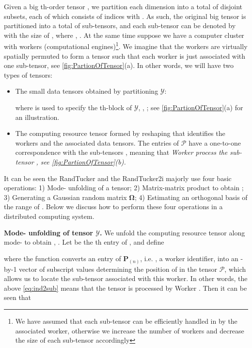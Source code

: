 \documentclass[10pt,twocolumn,twoside]{IEEEtran}
\newcommand{\mat}[1]{\ensuremath{\mathbf{#1}}}
\newcommand{\tensor}[1]{\ensuremath{\boldsymbol{\mathscr{#1}}}}
\newcommand{\tenmat}[2][n]{\ensuremath{{\mathbf{#2}}_{(#1)}}}
\begin{document}
Given a big th-order tensor , we partition each dimension  into a total of  disjoint subsets, each of which consists of  indices with . As such, the original big tensor is partitioned into a total of  sub-tensors, and each sub-tensor can be denoted by  with the size of , where , . At the same time suppose we have a computer cluster with  workers (computational engines)\footnote{We have assumed that each sub-tensor can be efficiently handled in by the associated worker, otherwise we increase the number of workers and decrease the size of each sub-tensor accordingly}. We imagine that the  workers are virtually spatially  permuted to form a   tensor such that each worker is just associated with one sub-tensor, see \figurename \ref{fig:PartionOfTensor}(a). 
In other words, we will have two types of tensors:
\begin{itemize}
\item The small data tensors obtained by partitioning \tensor{Y}: 

where  is used to specify the th-block of \tensor{Y}, , ; see \figurename \ref{fig:PartionOfTensor}(a) for an illustration.

\item
The computing resource tensor  formed by reshaping  that identifies the  workers and the associated data tensors. The entries of \tensor{P} have a one-to-one correspondence with the sub-tensors , meaning that \emph{ Worker  process the sub-tensor , see \figurename \ref{fig:PartionOfTensor}(b).}






\end{itemize}
 It can be seen the RandTucker and the RandTucker2i majorly use four basic operations: 1)  Mode- unfolding of a tensor; 2) Matrix-matrix product to obtain ;  3) Generating a Gaussian random matrix \mat{\Omega}; 4) Estimating an orthogonal basis of the range of . Below we discuss how to perform these four operations in a distributed computing system.

{\bf Mode- unfolding of tensor \tensor{Y}.} 
We unfold the computing resource tensor  along mode- to obtain , . Let   be the th entry of , and define

where the function  converts  an entry of \tenmat{P}, i.e. , a worker identifier, into an -by-1 vector of subscript values determining the position  of  in the tensor \tensor{P}, which allows us to locate the sub-tensor associated with this worker. In other words, the above \eqref{eq:ind2sub} means that the tensor   is processed by Worker . Then it can be seen that
\end{document}

